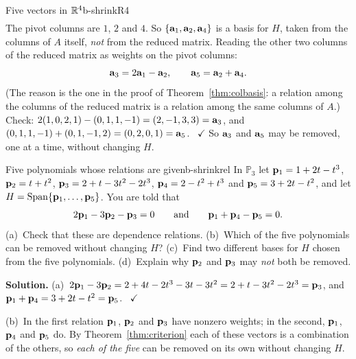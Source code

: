 \documentclass[11pt]{article}
\begin{document}
\begin{exmp}{Five vectors in $\mathbb{R}^4$}{b-shrinkR4}
\begin{align*}
\end{align*}
The pivot columns are $1$, $2$ and $4$. So $\{\mathbf{a}_1,\mathbf{a}_2,\mathbf{a}_4\}$ is a basis for $H$, taken from the columns of $A$ itself, \emph{not} from the reduced matrix. Reading the other two columns of the reduced matrix as weights on the pivot columns:
\[
\mathbf{a}_3=2\mathbf{a}_1-\mathbf{a}_2,\qquad \mathbf{a}_5=\mathbf{a}_2+\mathbf{a}_4.
\]
(The reason is the one in the proof of Theorem~\ref{thm:colbasis}: a relation among the columns of the reduced matrix is a relation among the same columns of $A$.) Check: $2(1,0,2,1)-(0,1,1,-1)=(2,-1,3,3)=\mathbf{a}_3$, and $(0,1,1,-1)+(0,1,-1,2)=(0,2,0,1)=\mathbf{a}_5$. \ $\checkmark$ So $\mathbf{a}_3$ and $\mathbf{a}_5$ may be removed, one at a time, without changing $H$.
\end{exmp}

\begin{exmp}{Five polynomials whose relations are given}{b-shrinkrel}
In $\mathbb{P}_3$ let $\mathbf{p}_1=1+2t-t^3$, $\mathbf{p}_2=t+t^2$, $\mathbf{p}_3=2+t-3t^2-2t^3$, $\mathbf{p}_4=2-t^2+t^3$ and $\mathbf{p}_5=3+2t-t^2$, and let $H=\operatorname{Span}\{\mathbf{p}_1,\dots,\mathbf{p}_5\}$. You are told that
\[
2\mathbf{p}_1-3\mathbf{p}_2-\mathbf{p}_3=0\qquad\text{and}\qquad \mathbf{p}_1+\mathbf{p}_4-\mathbf{p}_5=0.
\]
(a)~Check that these are dependence relations. (b)~Which of the five polynomials can be removed without changing $H$? (c)~Find two different bases for $H$ chosen from the five polynomials. (d)~Explain why $\mathbf{p}_2$ and $\mathbf{p}_3$ may \emph{not} both be removed.

\textbf{Solution.} (a)~$2\mathbf{p}_1-3\mathbf{p}_2=2+4t-2t^3-3t-3t^2=2+t-3t^2-2t^3=\mathbf{p}_3$, and $\mathbf{p}_1+\mathbf{p}_4=3+2t-t^2=\mathbf{p}_5$. \ $\checkmark$

(b)~In the first relation $\mathbf{p}_1$, $\mathbf{p}_2$ and $\mathbf{p}_3$ have nonzero weights; in the second, $\mathbf{p}_1$, $\mathbf{p}_4$ and $\mathbf{p}_5$ do. By Theorem~\ref{thm:criterion} each of these vectors is a combination of the others, so \emph{each of the five} can be removed on its own without changing $H$.


\end{exmp}
\end{document}
